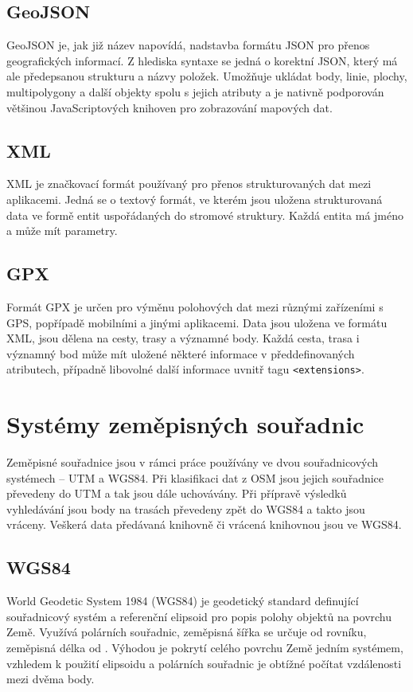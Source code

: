\subsection{GeoJSON}
GeoJSON\cite{GeoJSON} je, jak již název napovídá, nadstavba formátu JSON pro přenos
geografických informací. Z hlediska syntaxe se jedná o korektní JSON, který má
ale předepsanou strukturu a názvy položek. Umožňuje ukládat body, linie, plochy,
multipolygony a další objekty spolu s jejich atributy a je nativně podporován
většinou JavaScriptových knihoven pro zobrazování mapových dat.

\subsection{XML}
XML \cite{XML} je značkovací formát používaný pro přenos strukturovaných dat
mezi aplikacemi. Jedná se o textový formát, ve kterém jsou uložena strukturovaná
data ve formě entit uspořádaných do stromové struktury. Každá entita má jméno a
může mít parametry. 

\subsection{GPX}
Formát GPX\cite{GPX} je určen pro výměnu polohových dat mezi různými zařízeními s GPS,
popřípadě mobilními a jinými aplikacemi. Data jsou uložena ve formátu XML, jsou
dělena na cesty, trasy a významné body. Každá cesta, trasa i významný bod může
mít uložené některé informace v předdefinovaných atributech, případně libovolné
další informace uvnitř tagu {\tt <extensions>}. 

\section{Systémy zeměpisných souřadnic}
Zeměpisné souřadnice jsou v rámci práce používány ve dvou souřadnicových
systémech -- UTM a WGS84. Při klasifikaci dat z OSM jsou jejich souřadnice
převedeny do UTM a tak jsou dále uchovávány. Při přípravě výsledků vyhledávání
jsou body na trasách převedeny zpět do WGS84 a takto jsou vráceny. Veškerá data
předávaná knihovně či vrácená knihovnou jsou ve WGS84.
\subsection{WGS84}
World Geodetic System 1984 (WGS84) \cite{WGS84} je geodetický standard
definující souřadnicový systém a referenční elipsoid pro popis polohy objektů na
povrchu Země. Využívá polárních souřadnic, zeměpisná šířka se určuje od rovníku,
zeměpisná délka od . Výhodou je pokrytí celého
povrchu Země jedním systémem, vzhledem k použití elipsoidu a polárních souřadnic
je obtížné počítat vzdálenosti mezi dvěma body.
